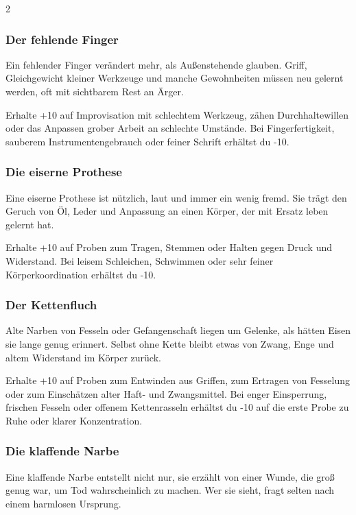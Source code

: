 {\begin{multicols*}{2}
        \subsubsection*{Der fehlende Finger}
        Ein fehlender Finger verändert mehr, als Außenstehende glauben. Griff, Gleichgewicht kleiner Werkzeuge und manche Gewohnheiten müssen neu gelernt werden, oft mit sichtbarem Rest an Ärger.

        \malspielwertebox
        {Erhalte +10 auf Improvisation mit schlechtem Werkzeug, zähen Durchhaltewillen oder das Anpassen grober Arbeit an schlechte Umstände.}
        {Bei Fingerfertigkeit, sauberem Instrumentengebrauch oder feiner Schrift erhältst du -10.}

        \subsubsection*{Die eiserne Prothese}
        Eine eiserne Prothese ist nützlich, laut und immer ein wenig fremd. Sie trägt den Geruch von Öl, Leder und Anpassung an einen Körper, der mit Ersatz leben gelernt hat.

        \malspielwertebox
        {Erhalte +10 auf Proben zum Tragen, Stemmen oder Halten gegen Druck und Widerstand.}
        {Bei leisem Schleichen, Schwimmen oder sehr feiner Körperkoordination erhältst du -10.}

        \subsubsection*{Der Kettenfluch}
        Alte Narben von Fesseln oder Gefangenschaft liegen um Gelenke, als hätten Eisen sie lange genug erinnert. Selbst ohne Kette bleibt etwas von Zwang, Enge und altem Widerstand im Körper zurück.

        \malspielwertebox
        {Erhalte +10 auf Proben zum Entwinden aus Griffen, zum Ertragen von Fesselung oder zum Einschätzen alter Haft- und Zwangsmittel.}
        {Bei enger Einsperrung, frischen Fesseln oder offenem Kettenrasseln erhältst du -10 auf die erste Probe zu Ruhe oder klarer Konzentration.}

        \subsubsection*{Die klaffende Narbe}
        Eine klaffende Narbe entstellt nicht nur, sie erzählt von einer Wunde, die groß genug war, um Tod wahrscheinlich zu machen. Wer sie sieht, fragt selten nach einem harmlosen Ursprung.


\end{multicols*}}
